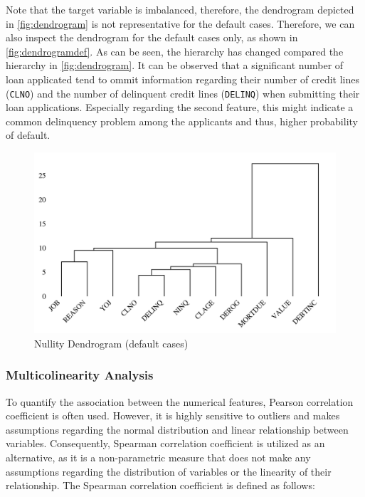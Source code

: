 Note that the target variable is imbalanced, therefore, the dendrogram depicted in \autoref{fig:dendrogram} is not representative for the default cases. Therefore, we can also inspect the dendrogram for the default cases only, as shown in \autoref{fig:dendrogramdef}.
As can be seen, the hierarchy has changed compared the hierarchy in \autoref{fig:dendrogram}. It can be observed that a significant number of loan applicated tend to ommit information regarding their number of credit lines (\texttt{CLNO}) and the number of delinquent credit lines (\texttt{DELINQ}) when submitting their loan applications. Especially regarding the second feature, this might indicate a common delinquency problem among the applicants and thus, higher probability of default.
\begin{figure}[H]
    \centering
    \caption{Nullity Dendrogram (default cases)}\vspace{0.5em}
    \label{fig:dendrogramdef}
    \includegraphics[width=140mm]{Figures/NA_Dendrogram_defaults.jpg}

    \vspace{-1em}
\end{figure}

\subsubsection{Multicolinearity Analysis}
\label{subsubsec:multicolinearity}
To quantify the association between the numerical features, Pearson correlation coefficient is often used.
However, it is highly sensitive to outliers and makes assumptions regarding the normal distribution and linear relationship between variables.
Consequently, Spearman correlation coefficient is utilized as an alternative, as it is a non-parametric measure that does not make any assumptions regarding the distribution of variables or the linearity of their relationship.
The Spearman correlation coefficient is defined as follows:

